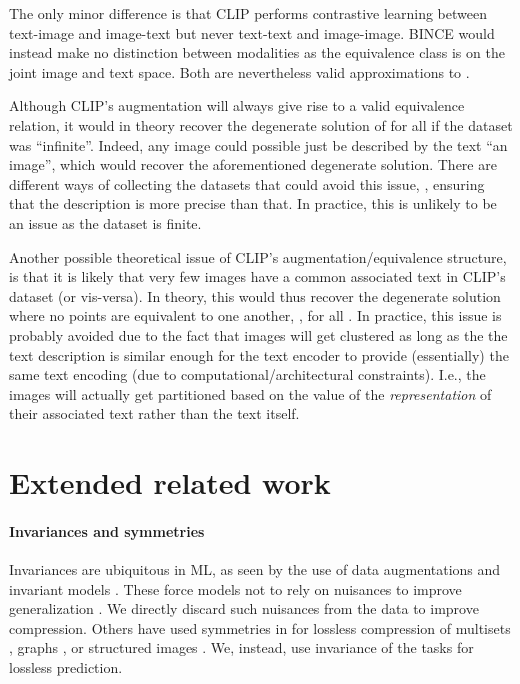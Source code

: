 \documentclass[final]{article}
\begin{document}
The only minor difference is that CLIP performs contrastive learning between text-image and image-text but never text-text and image-image. BINCE would instead make no distinction between modalities as the equivalence class is on the joint image and text space. Both are nevertheless valid approximations to .

Although CLIP's augmentation will always give rise to a valid equivalence relation, 
it would in theory recover the degenerate solution of  for all  if the dataset was ``infinite''.
Indeed, any image could possible just be described by the text ``an image'', which would recover the aforementioned degenerate solution. 
There are different ways of collecting the datasets that could avoid this issue, \eg, ensuring that the description is more precise than that.
In practice, this is unlikely to be an issue as the dataset is finite.

Another possible theoretical issue of CLIP's augmentation/equivalence structure, is that it is likely that very few images have a common associated text in CLIP's dataset (or vis-versa). 
In theory, this would thus recover the degenerate solution where no points are equivalent to one another, \ie,  for all .
In practice, this issue is probably avoided due to the fact that images will get clustered as long as the the text description is similar enough for the text encoder to provide (essentially) the same text encoding (due to computational/architectural constraints). 
I.e., the images will actually get partitioned based on the value of the \textit{representation} of their associated text rather than the text itself.  

\clearpage
\newpage 
\section{Extended related work}
\label{appx:related}
\paragraph{Invariances and symmetries}
 Invariances are ubiquitous in ML, as seen by the use of data augmentations \cite{shorten_survey_2019} and invariant models \cite{shawe-taylor_building_1989,wood_representation_1996,bruna_invariant_2013,cohen_group_2016,zaheer_deep_2017,kondor_generalization_2018,bloem-reddy_probabilistic_2020}.
These force models not to rely on nuisances to improve generalization \cite{dao_kernel_2019,chen_group-theoretic_2020,lyle_benefits_2020}.
We directly discard such nuisances from the data to improve compression.
Others have used symmetries in  for lossless compression of multisets \cite{varshney_benefiting_2007}, graphs \cite{choi_compression_2012,dehmer_history_2011,kontoyiannis_compression_2020}, or structured images \cite{sanchez_symmetry-based_2009,amraee_compression_2011,mitra_symmetry_2013,gnutti_representation_2015,bairagi_symmetry-based_2015}.
We, instead, use invariance of the tasks  for lossless prediction.
\end{document}
